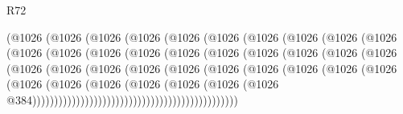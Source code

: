 \begin{lexlean}{R72}
\begin{coremodule}
                        (@1026
                          (@1026
                            (@1026
                              (@1026
                                (@1026
                                  (@1026
                                    (@1026
                                      (@1026
                                        (@1026
                                          (@1026
                                            (@1026
                                              (@1026
                                                (@1026
                                                  (@1026
                                                    (@1026
                                                      (@1026
                                                        (@1026
                                                          (@1026
                                                            (@1026
                                                              (@1026
                                                                (@1026
                                                                  (@1026
                                                                    (@1026
                                                                      (@1026
                                                                        (@1026
                                                                          (@1026
                                                                            (@1026
                                                                              (@1026
                                                                                (@1026
                                                                                  (@1026
                                                                                    (@1026
                                                                                      (@1026
                                                                                        (@1026
                                                                                          (@1026
                                                                                            (@1026
                                                                                              (@1026
                                                                                                (@1026
                                                                                                  @384)))))))))))))))))))))))))))))))))))))))))))))))

\end{coremodule}
\end{lexlean}
